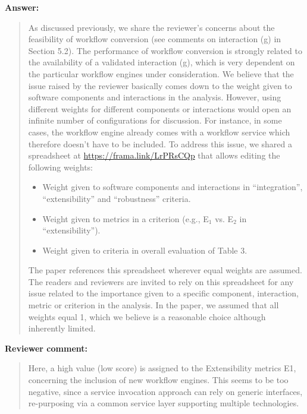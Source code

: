 \documentclass[a4]{article}
\newenvironment{review}%
{\textbf{Reviewer comment:}\begin{quote}}%
{\end{quote}}%
\newenvironment{answer}%
{\textbf{Answer:}\begin{small}\begin{quote}}%
{\end{quote}\end{small}}%
\begin{document}
\begin{answer}

  As discussed previously, we share the reviewer's concerns
  about the feasibility of workflow conversion (see comments on
  interaction (g) in Section 5.2). The performance of workflow
  conversion is strongly related to the availability of a validated
  interaction (g), which is very dependent on the particular workflow
  engines under consideration. We believe that the issue raised by the
  reviewer basically comes down to the weight given to software
  components and interactions in the analysis. However, using
  different weights for different components or interactions would
  open an infinite number of configurations for discussion. For
  instance, in some cases, the workflow engine already comes with a
  workflow service which therefore doesn't have to be included. To
  address this issue, we shared a spreadsheet at
  \url{https://frama.link/LrPRsCQp} that allows editing the following
  weights:
  \begin{itemize}
  \item Weight given to software components and interactions in
  ``integration'', ``extensibility'' and ``robustness'' criteria.
  \item Weight given to metrics in a criterion (e.g., E$_1$ vs. E$_2$ in
  ``extensibility'').
  \item Weight given to criteria in overall evaluation of Table 3.
\end{itemize}
The paper references this spreadsheet wherever equal weights are
assumed. The readers and reviewers are invited to rely on this
spreadsheet for any issue related to the importance given to a
specific component, interaction, metric or criterion in the
analysis. In the paper, we assumed that all weights equal 1, which we
believe is a reasonable choice although inherently limited.

\end{answer}

\begin{review}
  Here, a high value (low score) is assigned to the Extensibility
  metrics E1, concerning the inclusion of new workflow engines. This
  seems to be too negative, since a service invocation approach can
  rely on generic interfaces, re-purposing via a common service layer
  supporting multiple technologies.
\end{review}
\end{document}

